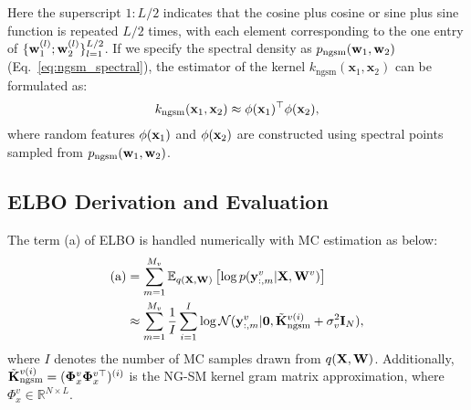 Here the superscript $1:L/2$ indicates that the cosine plus cosine or sine plus sine function is repeated $L/2$ times, with each element corresponding to the one entry of \( \{{\mathbf w}^{(l)}_1; {\mathbf w}^{(l)}_2 \}_{l=1}^{L/2} \). If we specify the spectral density as \(p_{\text{ngsm}}({\mathbf w}_1, {\mathbf w}_2)\) (Eq.~\eqref{eq:ngsm_spectral}), the estimator of the kernel \(k_{\text{ngsm}}(\mathbf{x}_1, \mathbf{x}_2)\) can be formulated as:
\begin{equation}
k_{\text{ngsm}}({\mathbf x}_1, {\mathbf x}_2) \approx \phi({\mathbf x}_1)^\top \phi({\mathbf x}_2),    
\end{equation}
where random features $\phi({\mathbf x}_1)$ and $\phi({\mathbf x}_2)$ are constructed using spectral points sampled from \(p_{\text{ngsm}}({\mathbf w}_1, {\mathbf w}_2)\). 

\subsection{ELBO Derivation and Evaluation}
\label{app:ELBO_deriviations}

The term (a) of \MakeUppercase{elbo} is handled numerically with \MakeUppercase{mc} estimation as below:
\begin{subequations} \label{eq:evaluation_term_1}
\begin{align}
   \text{(a)} & =\sum_{m=1}^{M_v} \mathbb{E}_{q({\mathbf X},{\mathbf W})} \left[ \log p({\mathbf y}_{:,m}^v \vert {\mathbf X}, {\mathbf W}^v) \right] \\
    & \approx \sum_{m=1}^{M_v}   \frac{1}{{I}}\sum_{i=1}^{I} \log \mathcal{N}({\mathbf y}_{:,m}^v \vert \boldsymbol{0}, \tilde{{{\mathbf K}}}_{\mathrm{ngsm}}^{v(i)} + \sigma_v^2 \mathbf{I}_N),
\end{align}
\end{subequations}
where ${I}$ denotes the number of \MakeUppercase{mc} samples drawn from $q({\mathbf X},{\mathbf W})$. Additionally, $\tilde{{{\mathbf K}}}_{\mathrm{ngsm}}^{v(i)} = (\boldsymbol \Phi_{x}^{v} \boldsymbol \Phi_{x}^{v \top})^{(i)}$ is the NG-SM kernel gram matrix approximation, where $\Phi_{x}^{v} \in \mathbb{R}^{N \times L}$.


